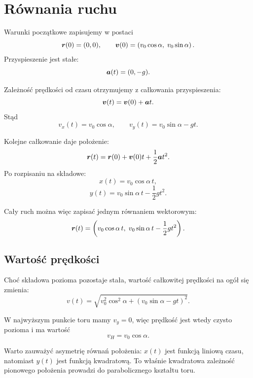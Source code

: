 \section{Równania ruchu}

Warunki początkowe zapisujemy w postaci
\[
\boldsymbol{r}(0)=(0,0),
\qquad
\boldsymbol{v}(0)=
\left(v_0\cos\alpha,\;v_0\sin\alpha\right).
\]
Przyspieszenie jest stałe:
\[
\boldsymbol{a}(t)=(0,-g).
\]

Zależność prędkości od czasu otrzymujemy z całkowania przyspieszenia:
\[
\boldsymbol{v}(t)=\boldsymbol{v}(0)+\boldsymbol{a}t.
\]
Stąd
\[
v_x(t)=v_0\cos\alpha,
\qquad
v_y(t)=v_0\sin\alpha-gt.
\]

Kolejne całkowanie daje położenie:
\[
\boldsymbol{r}(t)=\boldsymbol{r}(0)+\boldsymbol{v}(0)t+\frac{1}{2}\boldsymbol{a}t^2.
\]
Po rozpisaniu na składowe:
\[
x(t)=v_0\cos\alpha\,t,
\]
\[
y(t)=v_0\sin\alpha\,t-\frac{1}{2}gt^2.
\]

Cały ruch można więc zapisać jednym równaniem wektorowym:
\[
\boldsymbol{r}(t)=
\left(
v_0\cos\alpha\,t,\;
v_0\sin\alpha\,t-\frac{1}{2}gt^2
\right).
\]

\subsection{Wartość prędkości}

Choć składowa pozioma pozostaje stała, wartość całkowitej prędkości na ogół
się zmienia:
\[
v(t)=\sqrt{
  v_0^2\cos^2\alpha+
  \left(v_0\sin\alpha-gt\right)^2
}.
\]

W najwyższym punkcie toru mamy \(v_y=0\), więc prędkość jest wtedy czysto
pozioma i ma wartość
\[
v_H=v_0\cos\alpha.
\]

Warto zauważyć asymetrię równań położenia: \(x(t)\) jest funkcją liniową
czasu, natomiast \(y(t)\) jest funkcją kwadratową. To właśnie kwadratowa
zależność pionowego położenia prowadzi do parabolicznego kształtu toru.
